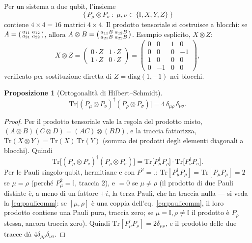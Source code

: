\documentclass[11pt,a4paper]{article}
\newtheorem{proposizione}{Proposizione}
\begin{document}
Per un sistema a due qubit, l'insieme
\begin{equation}
\big\{\,P_\mu\otimes P_\nu \;:\; \mu,\nu\in\{\mathbb I,X,Y,Z\}\,\big\}
\end{equation}
contiene $4\times4=16$ matrici $4\times4$. Il prodotto tensoriale si costruisce a blocchi: se
$A=\begin{psmallmatrix}a_{11}&a_{12}\\a_{21}&a_{22}\end{psmallmatrix}$, allora
$A\otimes B=\begin{psmallmatrix}a_{11}B&a_{12}B\\a_{21}B&a_{22}B\end{psmallmatrix}$. Esempio
esplicito, $X\otimes Z$:
\begin{equation}
X\otimes Z=\begin{pmatrix}0\cdot Z & 1\cdot Z\\ 1\cdot Z & 0\cdot Z\end{pmatrix}
=\begin{pmatrix}0&0&1&0\\0&0&0&-1\\1&0&0&0\\0&-1&0&0\end{pmatrix},
\end{equation}
verificato per sostituzione diretta di $Z=\mathrm{diag}(1,-1)$ nei blocchi.

\begin{proposizione}[Ortogonalità di Hilbert--Schmidt]
\label{prop:ortog}
\begin{equation}
\mathrm{Tr}\big[(P_\mu\otimes P_\nu)^\dagger(P_\rho\otimes P_\sigma)\big]=4\,\delta_{\mu\rho}\,\delta_{\nu\sigma}.
\end{equation}
\end{proposizione}
\begin{proof}
Per il prodotto tensoriale vale la regola del prodotto misto,
$(A\otimes B)(C\otimes D)=(AC)\otimes(BD)$, e la traccia fattorizza,
$\mathrm{Tr}(X\otimes Y)=\mathrm{Tr}(X)\,\mathrm{Tr}(Y)$ (somma dei prodotti degli elementi
diagonali a blocchi). Quindi
\begin{equation}
\mathrm{Tr}\big[(P_\mu\otimes P_\nu)^\dagger(P_\rho\otimes P_\sigma)\big]
=\mathrm{Tr}\big[P_\mu^\dagger P_\rho\big]\cdot\mathrm{Tr}\big[P_\nu^\dagger P_\sigma\big].
\end{equation}
Per le Pauli singolo-qubit, hermitiane e con $P^2=\mathbb I$: $\mathrm{Tr}[P_\mu^\dagger
P_\rho]=\mathrm{Tr}[P_\mu P_\rho]=2$ se $\mu=\rho$ (perché $P_\mu^2=\mathbb I$, traccia 2), e
$=0$ se $\mu\neq\rho$ (il prodotto di due Pauli distinte è, a meno di un fattore $\pm i$, la
terza Pauli, che ha traccia nulla --- si veda la \eqref{eq:paulicomm}: se $[\mu,\rho]$ è una
coppia dell'eq.~\eqref{eq:paulicomm}, il loro prodotto contiene una Pauli pura, traccia zero;
se $\mu=\mathbb I,\rho\neq\mathbb I$ il prodotto è $P_\rho$ stessa, ancora traccia zero). Quindi
$\mathrm{Tr}[P_\mu^\dagger P_\rho]=2\delta_{\mu\rho}$, e il prodotto delle due tracce dà
$4\delta_{\mu\rho}\delta_{\nu\sigma}$.
\end{proof}
\end{document}
